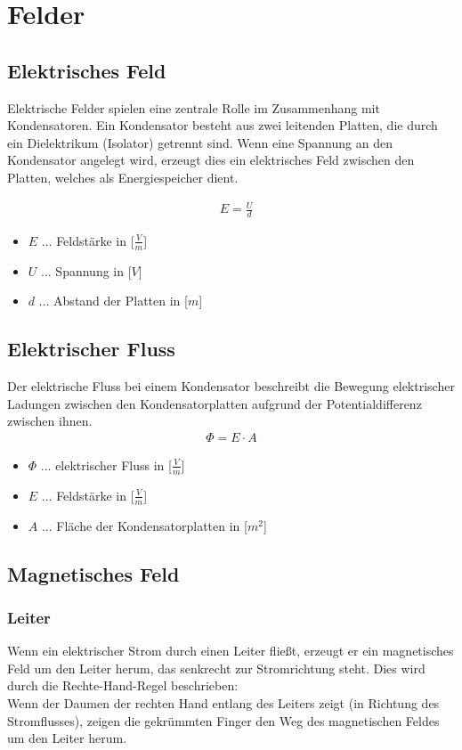 \chapter{Felder}

\section{Elektrisches Feld}
Elektrische Felder spielen eine zentrale Rolle im Zusammenhang mit Kondensatoren. Ein Kondensator besteht aus zwei leitenden Platten, die durch ein Dielektrikum (Isolator) getrennt sind. Wenn eine Spannung an den Kondensator angelegt wird, erzeugt dies ein elektrisches Feld zwischen den Platten, welches als Energiespeicher dient.

\begin{align}
    &E = \frac{U}{d}    
\end{align}

\begin{itemize}
    \item $E$ ... Feldstärke in [$\frac{V}{m}$]
    \item $U$ ... Spannung in [$V$]
    \item $d$ ... Abstand der Platten in [$m$]
\end{itemize}

\section{Elektrischer Fluss}
Der elektrische Fluss bei einem Kondensator beschreibt die Bewegung elektrischer Ladungen zwischen den Kondensatorplatten aufgrund der Potentialdifferenz zwischen ihnen.
\begin{align}
    \Phi = E \cdot A
\end{align}
\begin{itemize}
    \item $\Phi$ ... elektrischer Fluss in [$\frac{V}{m}$]
    \item $E$ ... Feldstärke in [$\frac{V}{m}$]
    \item $A$ ... Fläche der Kondensatorplatten in [$m^2$]
\end{itemize}

\section{Magnetisches Feld}

\subsection{Leiter}
Wenn ein elektrischer Strom durch einen Leiter fließt, erzeugt er ein magnetisches Feld um den Leiter herum, das senkrecht zur Stromrichtung steht. Dies wird durch die Rechte-Hand-Regel beschrieben: \\
Wenn der Daumen der rechten Hand entlang des Leiters zeigt (in Richtung des Stromflusses), zeigen die gekrümmten Finger den Weg des magnetischen Feldes um den Leiter herum.
